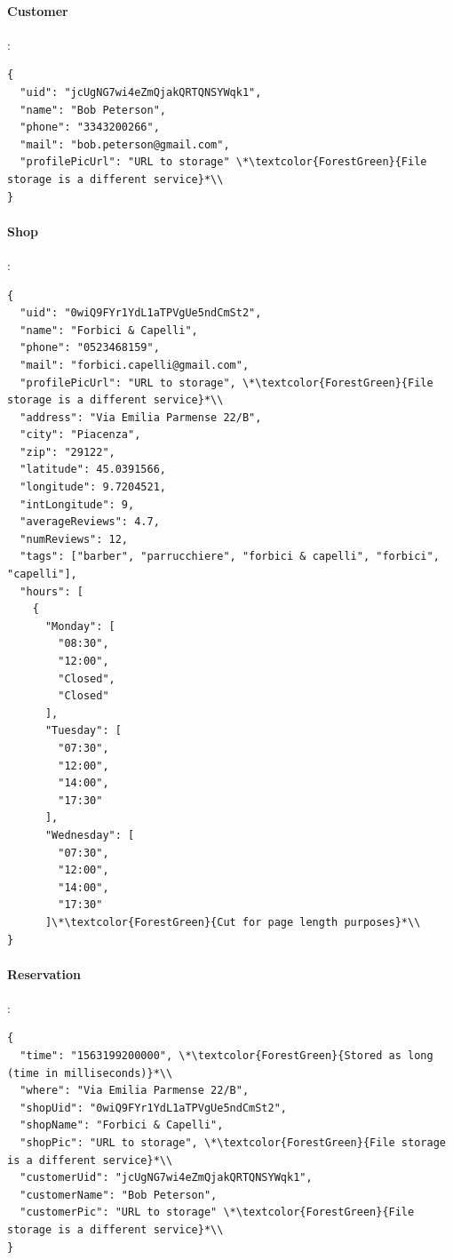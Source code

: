 \paragraph*{Customer}:
\label{Par:Customer}
\begin{lstlisting}
{
  "uid": "jcUgNG7wi4eZmQjakQRTQNSYWqk1",
  "name": "Bob Peterson",
  "phone": "3343200266",
  "mail": "bob.peterson@gmail.com",
  "profilePicUrl": "URL to storage" \*\textcolor{ForestGreen}{File storage is a different service}*\\
}
\end{lstlisting}
\paragraph*{Shop}:
\label{Par:Shop}
\begin{lstlisting}
{
  "uid": "0wiQ9FYr1YdL1aTPVgUe5ndCmSt2",
  "name": "Forbici & Capelli",
  "phone": "0523468159",
  "mail": "forbici.capelli@gmail.com",
  "profilePicUrl": "URL to storage", \*\textcolor{ForestGreen}{File storage is a different service}*\\
  "address": "Via Emilia Parmense 22/B",
  "city": "Piacenza",
  "zip": "29122",
  "latitude": 45.0391566,
  "longitude": 9.7204521,
  "intLongitude": 9,
  "averageReviews": 4.7,
  "numReviews": 12,
  "tags": ["barber", "parrucchiere", "forbici & capelli", "forbici", "capelli"],
  "hours": [
    {
      "Monday": [
        "08:30",
        "12:00",
        "Closed",
        "Closed"
      ],
      "Tuesday": [
        "07:30",
        "12:00",
        "14:00",
        "17:30"
      ],
      "Wednesday": [
        "07:30",
        "12:00",
        "14:00",
        "17:30"
      ]\*\textcolor{ForestGreen}{Cut for page length purposes}*\\
}
\end{lstlisting}
\clearpage
\paragraph*{Reservation}:
\label{Par:Reservation}
\begin{lstlisting}
{
  "time": "1563199200000", \*\textcolor{ForestGreen}{Stored as long (time in milliseconds)}*\\
  "where": "Via Emilia Parmense 22/B",
  "shopUid": "0wiQ9FYr1YdL1aTPVgUe5ndCmSt2",
  "shopName": "Forbici & Capelli",
  "shopPic": "URL to storage", \*\textcolor{ForestGreen}{File storage is a different service}*\\
  "customerUid": "jcUgNG7wi4eZmQjakQRTQNSYWqk1",
  "customerName": "Bob Peterson",
  "customerPic": "URL to storage" \*\textcolor{ForestGreen}{File storage is a different service}*\\
}
\end{lstlisting}
